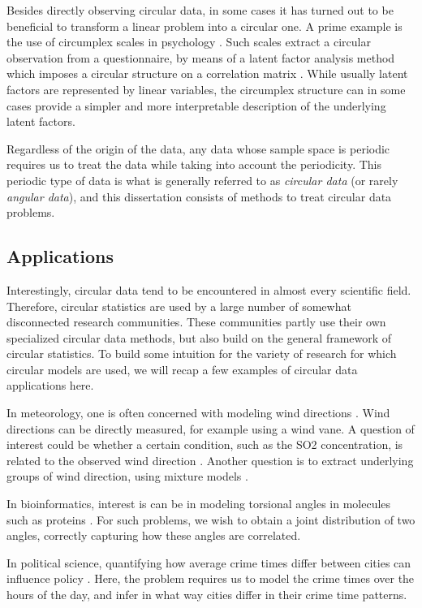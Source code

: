 \documentclass[12pt, a4paper]{book}\usepackage[]{graphicx}\usepackage[]{color}
\begin{document}
Besides directly observing circular data, in some cases it has turned out to be beneficial to transform a linear problem into a circular one. A prime example is the use of circumplex scales in psychology \citep{gurtmancircumplex}. Such scales extract a circular observation from a questionnaire, by means of a latent factor analysis method which imposes a circular structure on a correlation matrix \citep{browne1992circumplex}. While usually latent factors are represented by linear variables, the circumplex structure can in some cases provide a simpler and more interpretable description of the underlying latent factors.

Regardless of the origin of the data, any data whose sample space is periodic requires us to treat the data while taking into account the periodicity. This periodic type of data is what is generally referred to as \textit{circular data} (or rarely \textit{angular data}), and this dissertation consists of methods to treat circular data problems.

\subsection{Applications}

Interestingly, circular data tend to be encountered in almost every scientific field. Therefore, circular statistics are used by a large number of somewhat disconnected research communities. These communities partly use their own specialized circular data methods, but also build on the general framework of circular statistics. To build some intuition for the variety of research for which circular models are used, we will recap a few examples of circular data applications here.

In meteorology, one is often concerned with modeling wind directions \citep{bowers2000directional}. Wind directions can be directly measured, for example using a wind vane. A question of interest could be whether a certain condition, such as the SO2 concentration, is related to the observed wind direction \citep{garcia2013exploring}. Another question is to extract underlying groups of wind direction, using mixture models \citep{masseran2013fitting}.

In bioinformatics, interest is can be in modeling torsional angles in molecules such as proteins \citep{mardia2008multivariate}. For such problems, we wish to obtain a joint distribution of two angles, correctly capturing how these angles are correlated.

In political science, quantifying how average crime times differ between cities can influence policy \citep{gill2010}. Here, the problem requires us to model the crime times over the hours of the day, and infer in what way cities differ in their crime time patterns.
\end{document}
